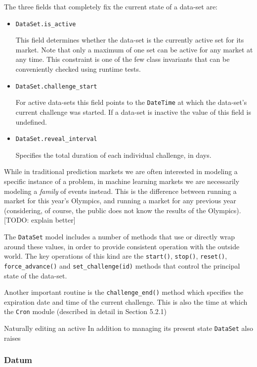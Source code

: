 \documentclass[bsc,frontabs,twoside,singlespacing,parskip,deptreport]{infthesis}     %
\begin{document}
	The three fields that completely fix the current state of a data-set are:
\begin{itemize}

\item {\tt DataSet.is\_active}

	This field determines whether the data-set is the currently active set for its market. Note that only a maximum of one set can be active for any market at any time. This constraint is one of the few class invariants that can be conveniently checked using runtime tests. 

\item {\tt DataSet.challenge\_start}

	For active data-sets this field points to the {\tt DateTime} at which the data-set's current challenge was started. If a data-set is inactive the value of this field is undefined. 

\item {\tt DataSet.reveal\_interval}

	Specifies the total duration of each individual challenge, in days. 

\end{itemize}
    While in traditional prediction markets we are often interested in modeling a specific instance of a problem, in machine learning markets we are necessarily modeling a {\em family} of events instead. This is the difference between running a market for this year’s Olympics, and running a market for any previous year (considering, of course, the public does not know the results of the Olympics). [TODO: explain better]

	The {\tt DataSet} model includes a number of methods that use or directly wrap around these values, in order to provide consistent operation with the outside world. The key operations of this kind are the {\tt start()}, {\tt stop()}, {\tt reset()}, {\tt force\_advance()} and {\tt set\_challenge(id)} methods that control the principal state of the data-set. 

	Another important routine is the {\tt challenge\_end()} method which specifies the expiration date and time of the current challenge. This is also the time at which the {\tt Cron} module (described in detail in Section 5.2.1)

	Naturally editing an active 
	In addition to managing its present state {\tt DataSet} also raises 
    
\subsubsection{Datum}
\end{document}
